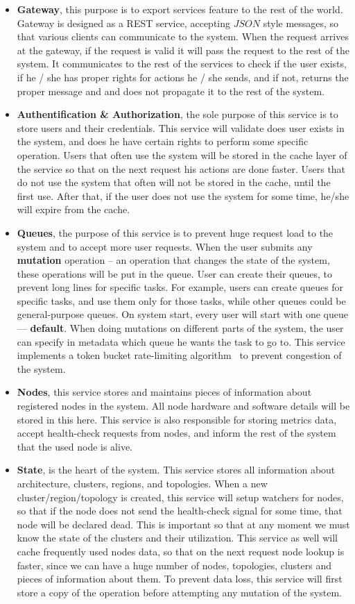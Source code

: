 \begin{itemize}
	\item \textbf{Gateway}, this purpose is to export services feature to the rest of the world. Gateway is designed as a REST service, accepting $JSON$ style messages, so that various clients can communicate to the system. When the request arrives at the gateway, if the request is valid it will pass the request to the rest of the system. It communicates to the rest of the services to check if the user exists, if he / she has proper rights for actions he / she sends, and if not, returns the proper message and and does not propagate it to the rest of the system.
	\item \textbf{Authentification \& Authorization}, the sole purpose of this service is to store users and their credentials. This service will validate does user exists in the system, and does he have certain rights to perform some specific operation. Users that often use the system will be stored in the cache layer of the service so that on the next request his actions are done faster. Users that do not use the system that often will not be stored in the cache, until the first use. After that, if the user does not use the system for some time, he/she will expire from the cache.
	\item \textbf{Queues}, the purpose of this service is to prevent huge request load to the system and to accept more user requests. When the user submits any \textbf{mutation} operation -- an operation that changes the state of the system, these operations will be put in the queue. User can create their queues, to prevent long lines for specific tasks. For example, users can create queues for specific tasks, and use them only for those tasks, while other queues could be general-purpose queues. On system start, every user will start with one queue --- \textbf{default}. When doing mutations on different parts of the system, the user can specify in metadata which queue he wants the task to go to. This service implements a token bucket rate-limiting algorithm~\cite{MathewsKG17} to prevent congestion of the system.
	\item \textbf{Nodes}, this service stores and maintains pieces of information about registered nodes in the system. All node hardware and software details will be stored in this here. This service is also responsible for storing metrics data, accept health-check requests from nodes, and inform the rest of the system that the used node is alive.
	\item \textbf{State}, is the heart of the system. This service stores all information about architecture, clusters, regions, and topologies. When a new cluster/region/topology is created, this service will setup watchers for nodes, so that if the node does not send the health-check signal for some time, that node will be declared dead. This is important so that at any moment we must know the state of the clusters and their utilization. This service as well will cache frequently used nodes data, so that on the next request node lookup is faster, since we can have a huge number of nodes, topologies, clusters and pieces of information about them. To prevent data loss, this service will first store a copy of the operation before attempting any mutation of the system.

\end{itemize}
